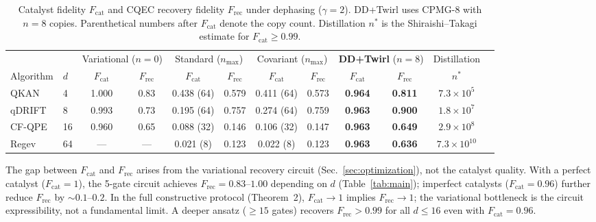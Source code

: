 \documentclass[prx,twocolumn,superscriptaddress,longbibliography,floatfix]{revtex4-2}
\begin{document}
\begin{table}[t]
\caption{Catalyst fidelity $F_\mathrm{cat}$ and CQEC recovery fidelity $F_\mathrm{rec}$ under dephasing ($\gamma = 2$). DD+Twirl uses CPMG-8 with $n = 8$ copies. Parenthetical numbers after $F_\mathrm{cat}$ denote the copy count. Distillation $n^*$ is the Shiraishi--Takagi estimate for $F_\mathrm{cat} \geq 0.99$.}
\label{tab:unified_comparison}
\begin{ruledtabular}
\begin{tabular}{llcccccccccc}
& & \multicolumn{2}{c}{Variational ($n = 0$)} & \multicolumn{2}{c}{Standard ($n_\mathrm{max}$)} & \multicolumn{2}{c}{Covariant ($n_\mathrm{max}$)} & \multicolumn{2}{c}{\textbf{DD+Twirl} ($n = 8$)} & Distillation \\
Algorithm & $d$ & $F_\mathrm{cat}$ & $F_\mathrm{rec}$ & $F_\mathrm{cat}$ & $F_\mathrm{rec}$ & $F_\mathrm{cat}$ & $F_\mathrm{rec}$ & $F_\mathrm{cat}$ & $F_\mathrm{rec}$ & $n^*$ \\
\colrule
QKAN & 4 & 1.000 & 0.83 & 0.438 (64) & 0.579 & 0.411 (64) & 0.573 & \textbf{0.964} & \textbf{0.811} & $7.3 \times 10^5$ \\
qDRIFT & 8 & 0.993 & 0.73 & 0.195 (64) & 0.757 & 0.274 (64) & 0.759 & \textbf{0.963} & \textbf{0.900} & $1.8 \times 10^7$ \\
CF-QPE & 16 & 0.960 & 0.65 & 0.088 (32) & 0.146 & 0.106 (32) & 0.147 & \textbf{0.963} & \textbf{0.649} & $2.9 \times 10^8$ \\
Regev & 64 & --- & --- & 0.021 (8) & 0.123 & 0.022 (8) & 0.123 & \textbf{0.963} & \textbf{0.636} & $7.3 \times 10^{10}$ \\
\end{tabular}
\end{ruledtabular}
\end{table}

The gap between $F_\mathrm{cat}$ and $F_\mathrm{rec}$ arises from the variational recovery circuit (Sec.~\ref{sec:optimization}), not the catalyst quality.
With a perfect catalyst ($F_\mathrm{cat} = 1$), the 5-gate circuit achieves $F_\mathrm{rec} = 0.83$--$1.00$ depending on $d$ (Table~\ref{tab:main}); imperfect catalysts ($F_\mathrm{cat} = 0.96$) further reduce $F_\mathrm{rec}$ by $\sim\!0.1$--$0.2$.
In the full constructive protocol (Theorem~2), $F_\mathrm{cat} \to 1$ implies $F_\mathrm{rec} \to 1$; the variational bottleneck is the circuit expressibility, not a fundamental limit.
A deeper ansatz ($\geq 15$ gates) recovers $F_\mathrm{rec} > 0.99$ for all $d \leq 16$ even with $F_\mathrm{cat} = 0.96$.
\end{document}
